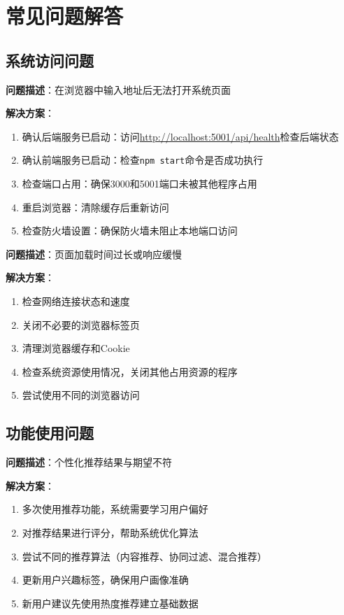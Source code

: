 \documentclass[12pt, a4paper]{article}
\begin{document}
\section{常见问题解答}

\subsection{系统访问问题}

\begin{infobox}[title={Q1: 无法访问系统页面}]
\textbf{问题描述}：在浏览器中输入地址后无法打开系统页面

\textbf{解决方案}：
\begin{enumerate}[nosep]
    \item 确认后端服务已启动：访问\url{http://localhost:5001/api/health}检查后端状态
    \item 确认前端服务已启动：检查\texttt{npm start}命令是否成功执行
    \item 检查端口占用：确保3000和5001端口未被其他程序占用
    \item 重启浏览器：清除缓存后重新访问
    \item 检查防火墙设置：确保防火墙未阻止本地端口访问
\end{enumerate}
\end{infobox}

\begin{infobox}[title={Q2: 页面加载缓慢}]
\textbf{问题描述}：页面加载时间过长或响应缓慢

\textbf{解决方案}：
\begin{enumerate}[nosep]
    \item 检查网络连接状态和速度
    \item 关闭不必要的浏览器标签页
    \item 清理浏览器缓存和Cookie
    \item 检查系统资源使用情况，关闭其他占用资源的程序
    \item 尝试使用不同的浏览器访问
\end{enumerate}
\end{infobox}

\subsection{功能使用问题}

\begin{successbox}[title={Q3: 推荐功能不准确}]
\textbf{问题描述}：个性化推荐结果与期望不符

\textbf{解决方案}：
\begin{enumerate}[nosep]
    \item 多次使用推荐功能，系统需要学习用户偏好
    \item 对推荐结果进行评分，帮助系统优化算法
    \item 尝试不同的推荐算法（内容推荐、协同过滤、混合推荐）
    \item 更新用户兴趣标签，确保用户画像准确
    \item 新用户建议先使用热度推荐建立基础数据
\end{enumerate}
\end{successbox}
\end{document}
